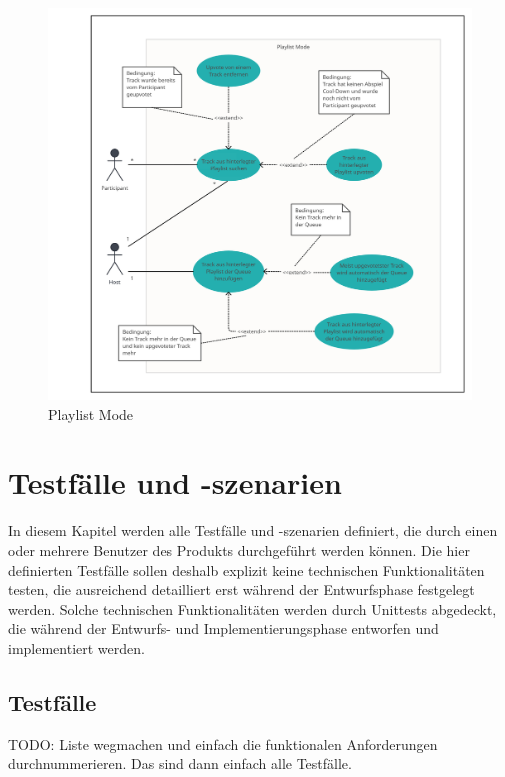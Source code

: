 \documentclass[oneside, ngerman]{sdqtechreport}
\begin{document}
\begin{figure}[h]
    \includegraphics[width = 16cm]{LATEX/Pflichtenheft/GraphicDesigns/Use Case Playlist Mode.png}
    \caption{Playlist Mode}
    \label{fig:Use Case Playlist Mode}
\end{figure}



\chapter{Testfälle und -szenarien}
\label{chap:Tests}

In diesem Kapitel werden alle Testfälle und -szenarien definiert, die durch einen oder mehrere Benutzer des Produkts durchgeführt werden können. Die hier definierten Testfälle sollen deshalb explizit keine technischen Funktionalitäten testen, die ausreichend detailliert erst während der Entwurfsphase festgelegt werden. Solche technischen Funktionalitäten werden durch Unittests abgedeckt, die während der Entwurfs- und Implementierungsphase entworfen und implementiert werden.

\section{Testfälle}
\label{sec:Tests:Testfälle}

TODO: Liste wegmachen und einfach die funktionalen Anforderungen durchnummerieren. Das sind dann einfach alle Testfälle.
\end{document}
